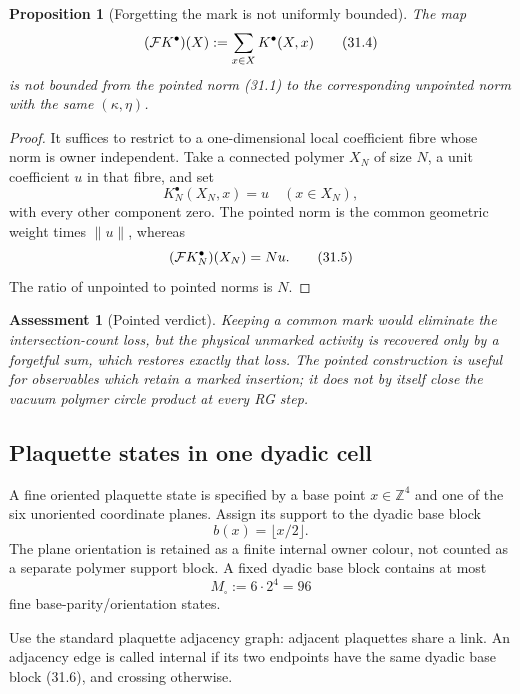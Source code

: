\documentclass[11pt,oneside]{book}
\newtheorem{proposition}[theorem]{Proposition}
\newtheorem{assessment}[theorem]{Assessment}
\theoremstyle{definition}
\theoremstyle{remark}
\begin{document}
\begin{proposition}[Forgetting the mark is not uniformly bounded]
\label{prop:e8v31-forget}
The map
\[
                 ({\cal F}K^\bullet)(X):=
                 \sum_{x\in X}K^\bullet(X,x)                     \tag{31.4}
\]
is not bounded from the pointed norm (31.1) to the corresponding
unpointed norm with the same \((\kappa,\eta)\).
\end{proposition}

\begin{proof}
It suffices to restrict to a one-dimensional local coefficient fibre
whose norm is owner independent.  Take a connected polymer \(X_N\) of
size \(N\), a unit coefficient \(u\) in that fibre, and set
\[
 K_N^\bullet(X_N,x)=u\quad(x\in X_N),
\]
with every other component zero.  The pointed norm is the common
geometric weight times \(\|u\|\), whereas
\[
                  ({\cal F}K_N^\bullet)(X_N)=Nu.                 \tag{31.5}
\]
The ratio of unpointed to pointed norms is \(N\).
\end{proof}

\begin{assessment}[Pointed verdict]
\label{ass:e8v31-pointed-verdict}
Keeping a common mark would eliminate the intersection-count loss,
but the physical unmarked activity is recovered only by a forgetful
sum, which restores exactly that loss.  The pointed construction is
useful for observables which retain a marked insertion; it does not
by itself close the vacuum polymer circle product at every RG step.
\end{assessment}

\subsection{Plaquette states in one dyadic cell}

A fine oriented plaquette state is specified by a base point
\(x\in{\mathbb Z}^4\) and one of the six unoriented coordinate
planes.  Assign its support to the dyadic base block
\[
                         b(x)=\lfloor x/2\rfloor.                 \tag{31.6}
\]
The plane orientation is retained as a finite internal owner colour,
not counted as a separate polymer support block.  A fixed dyadic base
block contains at most
\[
                              M_\square:=6\cdot2^4=96             \tag{31.7}
\]
fine base-parity/orientation states.

Use the standard plaquette adjacency graph: adjacent plaquettes share
a link.  An adjacency edge is called internal if its two endpoints
have the same dyadic base block (31.6), and crossing otherwise.
\end{document}
